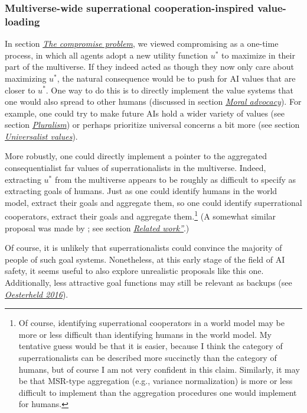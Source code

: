 \subsubsection{Multiverse-wide superrational cooperation-inspired
value-loading}\label{multiverse-wide-superrational-cooperation-inspired-value-loading}

In section \protect\hyperlink{the-compromise-problem}{\emph{The
compromise problem}}, we viewed compromising as a one-time process, in
which all agents adopt a new utility function \(u^{*}\) to maximize in
their part of the multiverse. If they indeed acted as though they now
only care about maximizing \(u^{*}\), the natural consequence would be
to push for AI values that are closer to \(u^{*}\). One way to do this
is to directly implement the value systems that one would also spread to
other humans (discussed in section
\protect\hyperlink{moral-advocacy}{\emph{Moral advocacy}}). For
example, one could try to make future AIs hold a wider variety of values
(see section \protect\hyperlink{pluralism}{\emph{Pluralism}}) or
perhaps prioritize universal concerns a bit more (see section
\protect\hyperlink{universalist-values}{\emph{Universalist
values}}).

More robustly, one could directly implement a pointer to the aggregated
consequentialist far values of superrationalists in the multiverse.
Indeed, extracting \(u^{*}\) from the multiverse appears to be roughly
as difficult to specify as extracting goals of humans. Just as one could
identify humans in the world model, extract their goals and aggregate
them, so one could identify superrational cooperators, extract their
goals and aggregate them.\footnote{Of course, identifying superrational
  cooperators in a world model may be more or less difficult than
  identifying humans in the world model. My tentative guess would be
  that it is easier, because I think the category of superrationalists
  can be described more succinctly than the category of humans, but of
  course I am not very confident in this claim. Similarly, it may be
  that MSR-type aggregation (e.g., variance normalization) is more or
  less difficult to implement than the aggregation procedures one would
  implement for humans.} (A somewhat similar proposal was made by
\parencite{Bostrom2014-gy}; see section
\protect\hyperlink{acausal-trade}{\emph{Related work''}}.)

Of course, it is unlikely that superrationalists could convince the
majority of people of such goal systems. Nonetheless, at this early
stage of the field of AI safety, it seems useful to also explore
unrealistic proposals like this one. Additionally, less attractive goal
functions may still be relevant as backups (see
\href{https://foundational-research.org/files/backup-utility-functions.pdf}{\emph{Oesterheld
2016}}).

